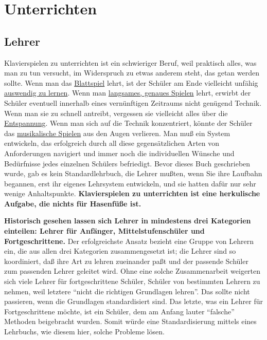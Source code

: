 
\section{Unterrichten}\hypertarget{c1iii16}{}

\subsection{Lehrer}\hypertarget{c1iii16a}{}

Klavierspielen zu unterrichten ist ein schwieriger Beruf, weil praktisch alles, was man zu tun versucht, im Widerspruch zu etwas anderem steht, das getan werden sollte.
Wenn man das \hyperlink{c1iii11}{Blattspiel} lehrt, ist der Schüler am Ende vielleicht unfähig \hyperlink{c1iii6}{auswendig zu lernen}.
Wenn man \hyperlink{c1ii17}{langsames, genaues Spielen} lehrt, erwirbt der Schüler eventuell innerhalb eines vernünftigen Zeitraums nicht genügend Technik.
Wenn man sie zu schnell antreibt, vergessen sie vielleicht alles über die \hyperlink{c1ii14}{Entspannung}.
Wenn man sich auf die Technik konzentriert, könnte der Schüler das \hyperlink{c1iii14d}{musikalische Spielen} aus den Augen verlieren.
Man muß ein System entwickeln, das erfolgreich durch all diese gegensätzlichen Arten von Anforderungen navigiert und immer noch die individuellen Wünsche und Bedürfnisse jedes einzelnen Schülers befriedigt.
Bevor dieses Buch geschrieben wurde, gab es kein Standardlehrbuch, die Lehrer mußten, wenn Sie ihre Laufbahn begannen, erst ihr eigenes Lehrsystem entwickeln, und sie hatten dafür nur sehr wenige Anhaltspunkte.
\textbf{Klavierspielen zu unterrichten ist eine herkulische Aufgabe, die nichts für Hasenfüße ist.}

\textbf{Historisch gesehen lassen sich Lehrer in mindestens drei Kategorien einteilen: Lehrer für Anfänger, Mittelstufenschüler und Fortgeschrittene.}
Der erfolgreichste Ansatz bezieht eine Gruppe von Lehrern ein, die aus allen drei Kategorien zusammengesetzt ist; die Lehrer sind so koordiniert, daß ihre Art zu lehren zueinander paßt und der passende Schüler zum passenden Lehrer geleitet wird.
Ohne eine solche Zusammenarbeit weigerten sich viele Lehrer für fortgeschrittene Schüler, Schüler von bestimmten Lehrern zu nehmen, weil letztere \enquote{nicht die richtigen Grundlagen lehren}.
Das sollte nicht passieren, wenn die Grundlagen standardisiert sind.
Das letzte, was ein Lehrer für Fortgeschrittene möchte, ist ein Schüler, dem am Anfang lauter \enquote{falsche} Methoden beigebracht wurden.
Somit würde eine Standardisierung mittels eines Lehrbuchs, wie diesem hier, solche Probleme lösen.


